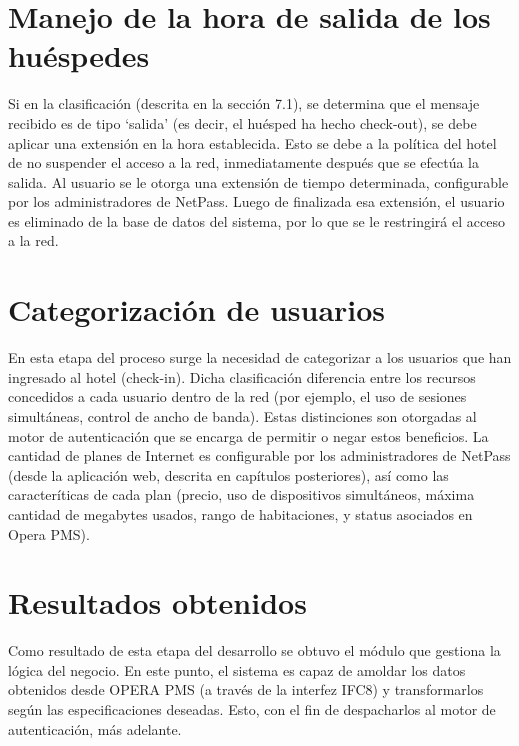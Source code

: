 \section{Manejo de la hora de salida de los huéspedes} \label{sect:Manejo de la hora de salida de los huespedes}
		Si en la clasificación (descrita en la sección 7.1), se determina que el mensaje recibido es de tipo ‘salida’ (es decir, el huésped ha hecho check-out), se debe aplicar una extensión en la hora establecida. Esto se debe a la política del hotel de no suspender el acceso a la red, inmediatamente después que se efectúa la salida. Al usuario se le otorga una extensión de tiempo determinada, configurable por los administradores de NetPass. Luego de finalizada esa extensión, el usuario es eliminado de la base de datos del sistema, por lo que se le restringirá el acceso a la red.
		
\section{Categorización de usuarios} \label{sect:Categorizacion de usuarios}
		En esta etapa del proceso surge la necesidad de categorizar a los usuarios que han ingresado al hotel (check-in). Dicha clasificación diferencia entre los recursos concedidos a cada usuario dentro de la red (por ejemplo, el uso de sesiones simultáneas, control de ancho de banda). Estas distinciones son otorgadas al motor de autenticación que se encarga de permitir o negar estos beneficios. La cantidad de planes de Internet es configurable por los administradores de NetPass (desde la aplicación web, descrita en capítulos posteriores), así como las caracteríticas de cada plan (precio, uso de dispositivos simultáneos, máxima cantidad de megabytes usados, rango de habitaciones, y status asociados en Opera PMS).
		
\section{Resultados obtenidos} \label{sect:Resultados obtenidos}
		Como resultado de esta etapa del desarrollo se obtuvo el módulo que gestiona la lógica del negocio. En este punto, el sistema es capaz de amoldar los datos obtenidos desde OPERA PMS (a través de la interfez IFC8) y transformarlos según las especificaciones deseadas. Esto, con el fin de despacharlos al motor de autenticación, más adelante.
		
